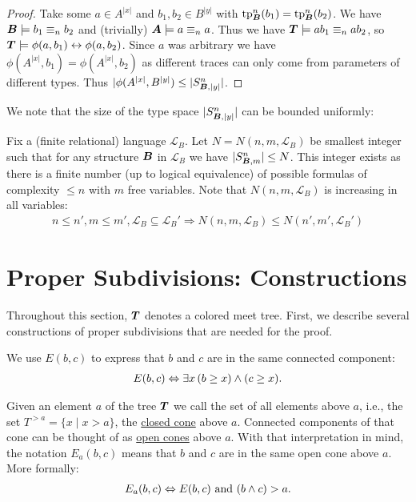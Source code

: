 \documentclass{amsart}
\DeclareMathOperator{\TT}{\boldface T}
\DeclareMathOperator{\AT}{\boldface A}
\DeclareMathOperator{\BT}{\boldface B}
\renewcommand{\LL}{\mathcal L}
\newcommand{\defn}{\underline}
\begin{document}
\begin{proof}
  Take some $a \in A^{|x|}$ and $b_1, b_2 \in B^{|y|}$ with $\tp^n_{\BT}(b_1) = \tp^n_{\BT}(b_2)$. We have $\BT \models b_1 \equiv_n b_2$ and (trivially) $\AT \models a \equiv_n a$. Thus  we have $\TT \models ab_1 \equiv_n ab_2$, so $\TT \models \phi(a, b_1) \leftrightarrow \phi(a, b_2)$. Since $a$ was arbitrary we have $\phi(A^{|x|}, b_1) = \phi(A^{|x|}, b_2)$ as different traces can only come from parameters of different types. Thus $|\phi(A^{|x|}, B^{|y|}) \leq |S^n_{\BT, |y|}|$.
\end{proof}

We note that the size of the type space $|S^n_{\BT, |y|}|$ can be bounded uniformly:

\begin{Definition} \label{def_type_count}
  Fix a (finite relational) language $\LL_B$. Let $N = N(n, m, \LL_B)$ be smallest integer such that for any structure $\BT$ in $\LL_B$ we have $|S^n_{\BT, m}| \leq N$. This integer exists as there is a finite number (up to logical equivalence) of possible formulas of complexity $\leq n$ with $m$ free variables.
  Note that $N(n, m, \LL_B)$ is increasing in all variables:
  \begin{align*}
    n \leq n', m \leq m', \LL_B \subseteq \LL_B' \Rightarrow N(n, m, \LL_B) \leq N(n', m', \LL_B')
  \end{align*}
\end{Definition}

\section{Proper Subdivisions: Constructions}

Throughout this section, $\TT$ denotes a colored meet tree.
First, we describe several constructions of proper subdivisions that are needed for the proof. 

\begin{Definition}
  We use $E(b,c)$ to express that $b$ and $c$ are in the same connected component:
  \begin{align*}
    E(b, c) \Leftrightarrow \exists x \, (b \geq x) \wedge (c \geq x).
  \end{align*}
\end{Definition}
\begin{Definition}
  Given an element $a$ of the tree $\TT$ we call the set of all elements above $a$, i.e., the set $T^{> a} = \{x \mid x > a\}$,
  the \defn{closed cone} above $a$.
  Connected components of that cone can be thought of as \defn{open cones} above $a$.
  With that interpretation in mind, the notation $E_a(b, c)$ means that $b$ and $c$ are in the same open cone above $a$. More formally:
  \begin{align*}
    E_a(b, c) \Leftrightarrow E(b,c) \text{ and } (b \wedge c) > a.
  \end{align*}
\end{Definition}
\end{document}

